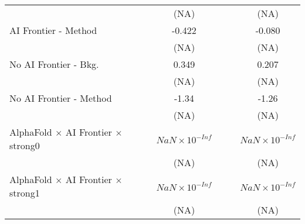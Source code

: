 \begin{tabular}{lcccccc}
                                                                              &                        &                        & (NA)                   &                        &                        & (NA)\\   
   AI Frontier - Method                                                       &                        &                        & -0.422                 &                        &                        & -0.080\\   
                                                                              &                        &                        & (NA)                   &                        &                        & (NA)\\   
   No AI Frontier - Bkg.                                                      &                        &                        & 0.349                  &                        &                        & 0.207\\   
                                                                              &                        &                        & (NA)                   &                        &                        & (NA)\\   
   No AI Frontier - Method                                                    &                        &                        & -1.34                  &                        &                        & -1.26\\   
                                                                              &                        &                        & (NA)                   &                        &                        & (NA)\\   
   AlphaFold $\times$ AI Frontier $\times$ strong0                            &                        &                        & $NaN\times 10^{-Inf}$  &                        &                        & $NaN\times 10^{-Inf}$\\    
                                                                              &                        &                        & (NA)                   &                        &                        & (NA)\\   
   AlphaFold $\times$ AI Frontier $\times$ strong1                            &                        &                        & $NaN\times 10^{-Inf}$  &                        &                        & $NaN\times 10^{-Inf}$\\    
                                                                              &                        &                        & (NA)                   &                        &                        & (NA)\\   

\end{tabular}
